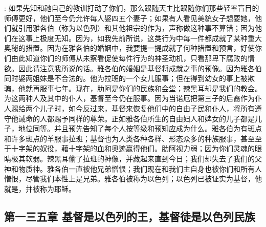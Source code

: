 : 如果先知和祂自己的教训打动了你们，那么跟随天主比跟随你们那些轻率盲目的师傅更好，他们至今仍允许每人娶四五个妻子；如果有人看见美貌女子想要她，他们就引用雅各伯（称为以色列）和其他祖宗的作为，声称做这种事不算错；因为他们在这事上极度无知。因为，如我先前所说，这类行为中每一件都成就了某种重大奥秘的措置。因为在雅各伯的婚姻中，我要提一提成就了何种措置和预言，好使你们由此知道你们的师傅从未察看促使每件行为的神圣动机，只看那卑下腐败的情欲。因此请注意我所说的话。雅各伯的婚姻是基督将成就之事的预像。因为雅各伯同时娶两姐妹是不合法的。他为拉班的一个女儿服事；但在得到幼女的事上被欺骗，他就再服事七年。现在，肋阿是你们的民族和会堂；辣黑耳却是我们的教会。为这两种人及其中的仆人，基督至今仍在服事。因为当诺厄把第三子的后裔作为仆人赐给两个儿子时，如今反过来，基督来恢复他们中的自由子民和仆人，将所有遵守他诫命的人都赐予同样的尊荣。正如雅各伯所生的自由妇人和婢女的儿子都是儿子，地位同等。并且预先告知了每个人按等级和预知应成为什么。雅各伯为有斑点和许多斑点的羊服事拉班；基督也为人类各种各样、形态众多的种族服事，甚至至于十字架的奴役，藉十字架的血和奥迹赢得他们。肋阿视力弱；因为你们灵魂的眼睛极其软弱。辣黑耳偷了拉班的神像，并藏起来直到今日；我们却失去了我们的父神和物质神。雅各伯一直被他兄弟憎恨；我们现在和我们主自身也被你们和所有人憎恨，尽管我们本性上是兄弟。雅各伯被称为以色列；以色列已被证实为基督，他就是，并被称为耶稣。\par


\subsection{第一三五章  基督是以色列的王，基督徒是以色列民族}

